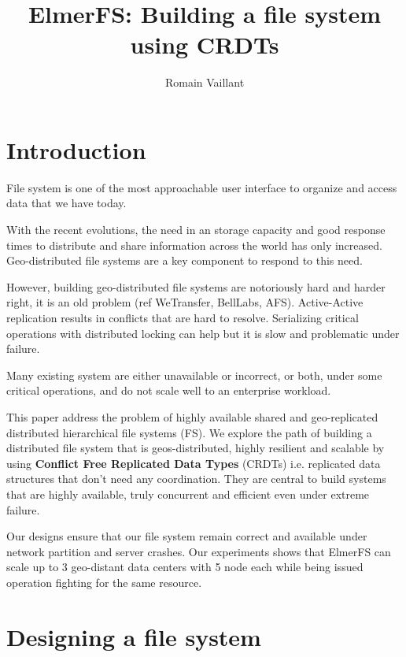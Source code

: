 \documentclass[sigplan, 10pt]{acmart}
\begin{document}
\author{Romain Vaillant}

\title{ElmerFS: Building a file system using CRDTs}

\begin{abstract}
\end{abstract}

\maketitle


\section{Introduction}

File system is one of the most approachable user interface to organize
and access data that we have today.

With the recent evolutions, the need in an storage capacity and
good response times to distribute and share information across the world has
only increased. Geo-distributed file systems are a key component
to respond to this need.

However, building geo-distributed file systems are notoriously hard and harder
right, it is an old problem (ref WeTransfer, BellLabs, AFS).
Active-Active replication results in conflicts that are hard to resolve.
Serializing critical operations with distributed locking can help but
it is slow and problematic under failure.

Many existing system are either unavailable or incorrect,
or both, under some critical operations, and do not scale well
to an enterprise workload.

This paper address the problem of highly available shared and geo-replicated
distributed hierarchical file systems (FS). We explore the path of
building a distributed file system that is geos-distributed,
highly resilient and scalable by using
\textbf{Conflict Free Replicated Data Types} (CRDTs) i.e. replicated data
structures that don't need any coordination. They are central to build systems
that are highly available, truly concurrent and efficient even
under extreme failure.

Our designs ensure that our file system remain correct and available under
network partition and server crashes. Our experiments shows that ElmerFS can
scale up to 3 geo-distant data centers with 5 node each while being issued
operation fighting for the same resource.

\section{Designing a file system}
\end{document}
